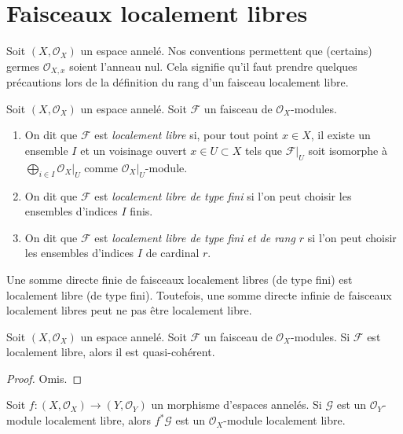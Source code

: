 \section{Faisceaux localement libres}
\label{section-locally-free}

\noindent
Soit $(X, \mathcal{O}_X)$ un espace annelé.
Nos conventions permettent que (certains) germes $\mathcal{O}_{X, x}$
soient l'anneau nul. Cela signifie qu'il faut prendre quelques précautions
lors de la définition du rang d'un faisceau localement libre.

\begin{definition}
\label{definition-locally-free}
Soit $(X, \mathcal{O}_X)$ un espace annelé.
Soit $\mathcal{F}$ un faisceau de $\mathcal{O}_X$-modules.
\begin{enumerate}
\item On dit que $\mathcal{F}$ est {\it localement libre} si, pour tout
point $x \in X$, il existe un ensemble $I$ et un
voisinage ouvert $x \in U \subset X$
tels que $\mathcal{F}|_U$ soit isomorphe à
$\bigoplus_{i \in I} \mathcal{O}_X|_U$ comme $\mathcal{O}_X|_U$-module.
\item On dit que $\mathcal{F}$ est {\it localement libre de type fini} si l'on peut
choisir les ensembles d'indices $I$ finis.
\item On dit que $\mathcal{F}$ est {\it localement libre de type fini et de rang $r$}
si l'on peut choisir les ensembles d'indices $I$ de cardinal $r$.
\end{enumerate}
\end{definition}

\noindent
Une somme directe finie de faisceaux localement libres (de type fini) est
localement libre (de type fini). Toutefois, une somme directe infinie
de faisceaux localement libres peut ne pas être localement libre.

\begin{lemma}
\label{lemma-locally-free-quasi-coherent}
Soit $(X, \mathcal{O}_X)$ un espace annelé.
Soit $\mathcal{F}$ un faisceau de $\mathcal{O}_X$-modules.
Si $\mathcal{F}$ est localement libre, alors il est quasi-cohérent.
\end{lemma}

\begin{proof}
Omis.
\end{proof}

\begin{lemma}
\label{lemma-pullback-locally-free}
Soit $f : (X, \mathcal{O}_X) \to (Y, \mathcal{O}_Y)$
un morphisme d'espaces annelés. Si $\mathcal{G}$ est
un $\mathcal{O}_Y$-module localement libre, alors
$f^*\mathcal{G}$ est un $\mathcal{O}_X$-module localement libre.
\end{lemma}

